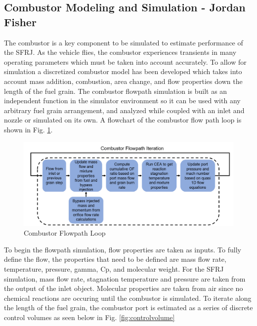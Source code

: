 \subsection{Combustor Modeling and Simulation - Jordan Fisher} \label{CombustorModelingAndSim}
The combustor is a key component to be simulated to estimate performance of the SFRJ. As the vehicle flies, the combustor experiences transients in many operating parameters which must be taken into account accurately. To allow for simulation a discretized combustor model has been developed which takes into account mass addition, combustion, area change, and flow properties down the length of the fuel grain. The combustor flowpath simulation is built as an independent function in the simulator environment so it can be used with any arbitrary fuel grain arrangement, and analyzed while coupled with an inlet and nozzle or simulated on its own. A flowchart of the combustor flow path loop is shown in Fig. \ref{fig:flowpath}. \\ \indent

\begin{figure}[hbt]
\centering
\includegraphics[width=1\textwidth] {Combustor_Figures/flowpath.PNG}
\caption{Combustor Flowpath Loop}
\label{fig:flowpath}
\end{figure}

To begin the flowpath simulation, flow properties are taken as inputs. To fully define the flow, the properties that need to be defined are mass flow rate, temperature, pressure, gamma, Cp, and molecular weight. For the SFRJ simulation, mass flow rate, stagnation temperature and pressure are taken from the output of the inlet object. Molecular properties are taken from air since no chemical reactions are occuring until the combustor is simulated. To iterate along the length of the fuel grain, the combustor port is estimated as a series of discrete control volumes as seen below in Fig. \ref{fig:controlvolume}\\ \indent

